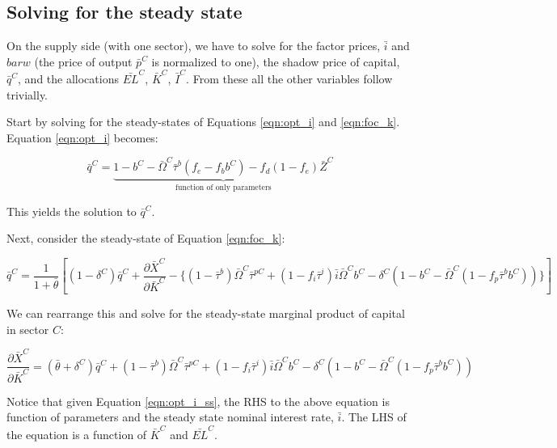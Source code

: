 \documentclass[article,11pt,letterpaper,fleqn]{article}
\theoremstyle{definition}
\numberwithin{equation}{section}
\begin{document}
\subsection{Solving for the steady state}

On the supply side (with one sector), we have to solve for the factor prices, $\bar{i}$ and $bar{w}$ (the price of output $\bar{p}^{C}$ is normalized to one), the shadow price of capital, $\bar{q}^{C}$, and the allocations $\bar{EL}^{C}$, $\bar{K}^{C}$, $\bar{I}^{C}$.  From these all the other variables follow trivially.  

Start by solving for the steady-states of Equations \ref{eqn:opt_i} and \ref{eqn:foc_k}.  Equation \ref{eqn:opt_i} becomes:

\begin{equation}
\label{eqn:opt_i_ss}
\bar{q}^{C}=\underbrace{1-b^{C}-\bar{\Omega}^{C}\bar{\tau}^{b}(f_{e}-f_{b}b^{C})-f_{d}(1-f_{e})\bar{Z}^{C}}_{\text{function of only parameters}}
\end{equation}

This yields the solution to $\bar{q}^{C}$.

Next, consider the steady-state of Equation \ref{eqn:foc_k}:

\begin{equation}
\label{eqn:foc_k_ss}
\bar{q}^{C}=\frac{1}{1+\bar{\theta}}\left[(1-\delta^{C})\bar{q}^{C} + \frac{\partial \bar{X}^{C}}{\partial \bar{K}^{C}} - \{(1-\bar{\tau}^{b})\bar{\Omega}^{C}\bar{\tau}^{pC} + (1-f_{i}\bar{\tau}^{i})\bar{i}\bar{\Omega}^{C}b^{C} - \delta^{C}(1-b^{C}-\bar{\Omega}^{C}(1-f_{p}\bar{\tau}^{b}b^{C}))\}\right]
\end{equation}

We can rearrange this and solve for the steady-state marginal product of capital in sector $C$:

\begin{equation}
\label{eqn:mpk_ss}
\frac{\partial \bar{X}^{C}}{\partial \bar{K}^{C}} = (\bar{\theta}+\delta^{C})\bar{q}^{C} + (1-\bar{\tau}^{b})\bar{\Omega}^{C}\bar{\tau}^{pC} + (1-f_{i}\bar{\tau}^{i})\bar{i}\bar{\Omega}^{C}b^{C} - \delta^{C}(1-b^{C}-\bar{\Omega}^{C}(1-f_{p}\bar{\tau}^{b}b^{C}))
\end{equation}

Notice that given Equation \ref{eqn:opt_i_ss}, the RHS to the above equation is function of parameters and the steady state nominal interest rate, $\bar{i}$.  The LHS of the equation is a function of $\bar{K}^{C}$ and $\bar{EL}^{C}$.
\end{document}
